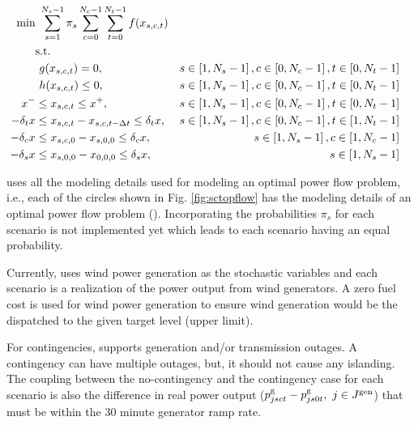 \begin{align}
\centering
\text{min}&~\sum_{s=1}^{N_s-1}\pi_s\sum_{c=0}^{N_c-1}\sum_{t=0}^{N_t-1}f(x_{s,c,t})&  \label{eq:sctopflow_start}\\
&\text{s.t.}& \nonumber \\
&~g(x_{s,c,t}) = 0,                                        &s \in \left[1,N_s-1\right],c \in \left[0,N_c-1\right], t \in \left[0,N_t-1\right]& \\
&~h(x_{s,c,t}) \le 0,                                      &s \in \left[1,N_s-1\right],c \in \left[0,N_c-1\right], t \in \left[0,N_t-1\right]& \\
x^- & \le x_{s,c,t} \le x^+,                               &s \in \left[1,N_s-1\right],c \in \left[0,N_c-1\right], t\in \left[0,N_t-1\right]& \\
-\delta_t{x} & \le x_{s,c,t} - x_{s,c,t-\Delta{t}} \le \delta_t{x},&s \in \left[1,N_s-1\right],c \in \left[0,N_c-1\right], t \in \left[1,N_t-1\right]& \label{eq:sctopflow_time_coupling}\\
-\delta_c{x} & \le x_{s,c,0} - x_{s,0,0} \le \delta_c{x},&s \in \left[1,N_s-1\right],c \in \left[1,N_c-1\right]&
\label{eq:sctopflow_contingency_coupling} \\
-\delta_s{x} & \le x_{s,0,0} - x_{0,0,0} \le \delta_s{x},&s \in \left[1,N_s-1\right]&
\label{eq:sctopflow_end}
\end{align}

{\sopflow} uses all the modeling details used for modeling an optimal power flow problem, i.e., each of the circles shown in Fig. \ref{fig:sctopflow} has the modeling details of an optimal power flow problem (\opflow). Incorporating the probabilities $\pi_s$ for each scenario is not implemented yet which leads to each scenario having an equal probability. 

Currently, \sopflow uses wind power generation as the stochastic variables and each scenario is a realization of the power output from wind generators. A zero fuel cost is used for wind power generation to ensure wind generation would be the dispatched to the given target level (upper limit). 

For contingencies, \sopflow supports generation and/or transmission outages. A contingency can have multiple outages, but, it should not cause any islanding. The coupling between the no-contingency and the contingency case for each scenario is also the difference in real power output ($p_{jsct}^{\text{g}} - p_{js0t}^{\text{g}},~ j \in J^\text{gen}$) that must be within the 30 minute generator ramp rate.

